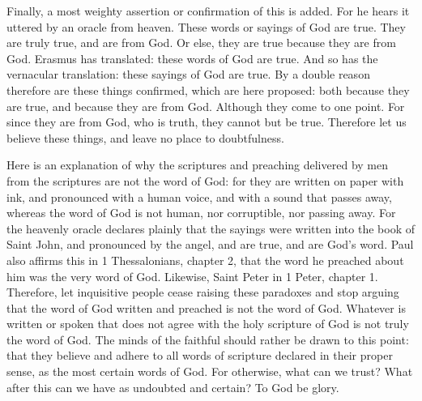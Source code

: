 Finally, a most weighty assertion or confirmation of this is added. For he hears it uttered by an oracle from heaven. These words or sayings of God are true. They are truly true, and are from God. Or else, they are true because they are from God. Erasmus has translated: these words of God are true. And so has the vernacular translation: these sayings of God are true. By a double reason therefore are these things confirmed, which are here proposed: both because they are true, and because they are from God. Although they come to one point. For since they are from God, who is truth, they cannot but be true. Therefore let us believe these things, and leave no place to doubtfulness.

Here is an explanation of why the scriptures and preaching delivered by men from the scriptures are not the word of God: for they are written on paper with ink, and pronounced with a human voice, and with a sound that passes away, whereas the word of God is not human, nor corruptible, nor passing away. For the heavenly oracle declares plainly that the sayings were written into the book of Saint John, and pronounced by the angel, and are true, and are God’s word. Paul also affirms this in 1 Thessalonians, chapter 2, that the word he preached about him was the very word of God. Likewise, Saint Peter in 1 Peter, chapter 1. Therefore, let inquisitive people cease raising these paradoxes and stop arguing that the word of God written and preached is not the word of God. Whatever is written or spoken that does not agree with the holy scripture of God is not truly the word of God. The minds of the faithful should rather be drawn to this point: that they believe and adhere to all words of scripture declared in their proper sense, as the most certain words of God. For otherwise, what can we trust? What after this can we have as undoubted and certain? To God be glory.
